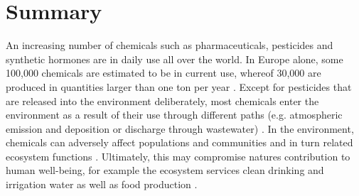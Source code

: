 \documentclass[journal,datadescriptor,accept,moreauthors,pdftex]{Definitions/mdpi}
\begin{document}


\section{Summary}
An increasing number of chemicals such as pharmaceuticals, pesticides and synthetic hormones are in daily use all over the world. In Europe alone, some 100,000 chemicals are estimated to be in current use, whereof 30,000 are produced in quantities larger than one ton per year \citep{breithaupt_costs_2006}. Except for pesticides that are released into the environment deliberately, most chemicals enter the environment as a result of their use through different paths (e.g. atmospheric emission and deposition or discharge through wastewater) \citep{schwarzenbach_challenge_2006}. In the environment, chemicals can adversely affect populations and communities and in turn related ecosystem functions \citep{schafer_thresholds_2012, malaj_organic_2014, hallmann_declines_2014, barracaracciolo_pharmaceuticals_2015, johnston_review_2015}. Ultimately, this may compromise natures contribution to human well-being, for example the ecosystem services clean drinking and irrigation water as well as food production \citep{peters_review_2013, vandersluijs_neonicotinoids_2013, yamamuro_neonicotinoids_2019}. 
\end{document}
